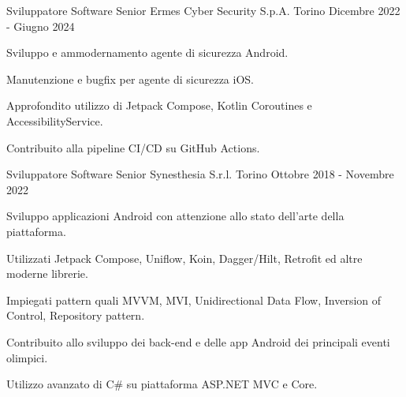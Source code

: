 

\begin{cventries}

  \cventry
    {Sviluppatore Software Senior} %
    {Ermes Cyber Security S.p.A.} %
    {Torino} %
    {Dicembre 2022 - Giugno 2024} %
    {
      \begin{cvitems} %
        \item {Sviluppo e ammodernamento agente di sicurezza Android.}
        \item {Manutenzione e bugfix per agente di sicurezza iOS.}
        \item {Approfondito utilizzo di Jetpack Compose, Kotlin Coroutines e AccessibilityService.}
        \item {Contribuito alla pipeline CI/CD su GitHub Actions.}
      \end{cvitems}
    }

  \cventry
    {Sviluppatore Software Senior} %
    {Synesthesia S.r.l.} %
    {Torino} %
    {Ottobre 2018 - Novembre 2022} %
    {
      \begin{cvitems} %
        \item {Sviluppo applicazioni Android con attenzione allo stato dell'arte della piattaforma.}
        \item {Utilizzati Jetpack Compose, Uniflow, Koin, Dagger/Hilt, Retrofit ed altre moderne librerie.}
        \item {Impiegati pattern quali MVVM, MVI, Unidirectional Data Flow, Inversion of Control, Repository pattern.}
        \item {Contribuito allo sviluppo dei back-end e delle app Android dei principali eventi olimpici.}
        \item {Utilizzo avanzato di C\# su piattaforma ASP.NET MVC e Core.}
      \end{cvitems}
    }


\end{cventries}
